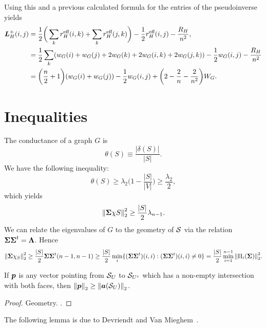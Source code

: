 Using this and a previous calculated formula for the entries of the pseudoinverse yields 
\begin{align*}
\vb*{L}_H^+(i,j) &= \frac{1}{2}\bigg(\sum_k r^{\text{eff}}_H(i,k) + \sum_k r^{\text{eff}}_H(j,k)\bigg) - \frac{1}{2} r^{\text{eff}}_H(i,j) - \frac{R_H}{n^2}, \\
&= \frac{1}{2}\sum_k (w_G(i) + w_G(j) + 2w_G(k) + 2w_G(i,k) + 2w_G(j,k)) - \frac{1}{2}w_G(i,j) - \frac{R_H}{n^2}\\
&= \bigg(\frac{n}{2}+1\bigg)(w_G(i)+w_G(j))  - \frac{1}{2}w_G(i,j) + \bigg(2-\frac{2}{n}-\frac{2}{n^2}\bigg)W_G.
\end{align*}


\section{Inequalities}

The conductance of a graph $G$ is 
\begin{equation*}
\theta(S) \equiv \frac{|\delta(S)|}{|S|}. 
\end{equation*}
We have the following inequality: 
\[\theta(S)\geq \lambda_2\bigg(1-\frac{|S|}{|V|}\bigg)\geq \frac{\lambda_2}{2},\]
which yields 
\[\norm{\boldsymbol{\Sigma} \chi S}_2^2 \geq \frac{|S|}{2}\lambda_{n-1}.\]
We can relate the eigenvalues of $G$ to the geometry of $\mathcal{S}$ via the relation $\boldsymbol{\Sigma}\boldsymbol{\Sigma}^t = \vb{\Lambda}$. Hence
\[\norm{\boldsymbol{\Sigma} \chi_S}_2^2 \geq \frac{|S|}{2} \boldsymbol{\Sigma}\boldsymbol{\Sigma}^t (n-1,n-1)\geq \frac{|S|}{2} \min_{i}\{(\boldsymbol{\Sigma}\boldsymbol{\Sigma}^t)(i,i):(\boldsymbol{\Sigma}\boldsymbol{\Sigma}^t)(i,i)\neq 0\} = \frac{|S|}{2}\min_{i=1}^{n-1} \norm{\Pi_i(\boldsymbol{\Sigma})}_2^2.  \]


\begin{lemma}
If $\vb*{p}$ is any vector pointing from $\mathcal{S}_U$ to $\mathcal{S}_{U^c}$ which has a non-empty intersection with both faces, then $\norm{\vb*{p}}_2 \geq \norm{\vb*{a}(\mathcal{S}_U)}_2$. 
\end{lemma}
\begin{proof}
Geometry. . 
\end{proof}

The following lemma is due to Devriendt and Van Mieghem~\cite{devriendt2018simplex}. 


